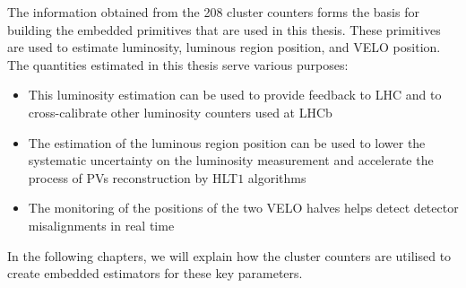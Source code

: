 The information obtained from the 208 cluster counters forms the basis for building the embedded primitives that are used in this thesis. These primitives are used to estimate luminosity, luminous region position, and VELO position. The quantities estimated in this thesis serve various purposes:
\begin{itemize}
    \item This luminosity estimation can be used to provide feedback to LHC and to cross-calibrate other luminosity counters used at LHCb
    \item The estimation of the luminous region position can be used to lower the systematic uncertainty on the luminosity measurement and accelerate the process of PVs reconstruction by HLT$1$ algorithms
    \item The monitoring of the positions of the two VELO halves helps detect detector misalignments in real time
\end{itemize}

In the following chapters, we will explain how the cluster counters are utilised to create embedded estimators for these key parameters. 
